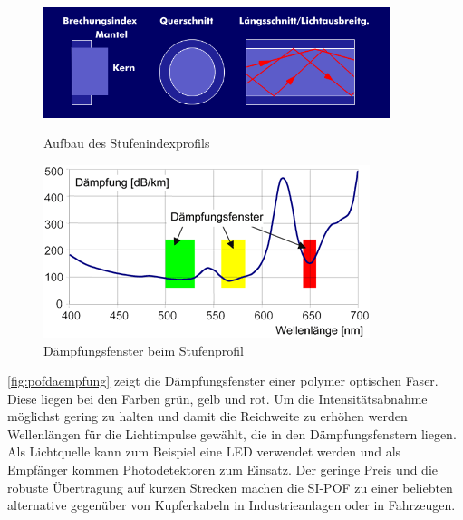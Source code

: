 \begin{figure}[h]
    \begin{center}
        \begin{minipage}[t]{0.4\textwidth}
            \begin{center}
                \includegraphics[width=0.9\textwidth]{Bilder/Optische_Wellenleiter_Die_Polymer_Optische_Faser/Brechzahlprofile/pofsi.png}
                \caption[Aufbau des Stufenindexprofils \newline \url{http://www.itwissen.info/bilder/aufbau-und-brechungsprofil-der-stufenindex-profilfaser.png} (zuletzt aufgerufen am 19.09.2015)]{Aufbau des Stufenindexprofils}
                \label{fig:pofsi}
            \end{center}
        \end{minipage}
        \hspace{0.025\textwidth}
        \begin{minipage}[t]{0.4\textwidth}
            \begin{center}
                \includegraphics[height=0.1\textheight]{Bilder/Optische_Wellenleiter_Die_Polymer_Optische_Faser/Funktionsweise/pofdaempfung.png}
                \caption[Dämpfungsfenster bei einer polymer optischen Faser \newline \url{http://www.pofac.fh-nuernberg.de/pofac/de/was_sind_pof/images/pmma_daempfung.png} (zuletzt aufgerufen am 19.09.2015)]{Dämpfungsfenster beim Stufenprofil}
                \label{fig:pofdaempfung}
            \end{center}
        \end{minipage}
    \end{center}
\end{figure}

\autoref{fig:pofdaempfung} zeigt die Dämpfungsfenster einer polymer optischen
Faser. Diese liegen bei den Farben grün, gelb und rot. Um die Intensitätsabnahme
möglichst gering zu halten und damit die Reichweite zu erhöhen werden
Wellenlängen für die Lichtimpulse gewählt, die in den Dämpfungsfenstern liegen.
Als Lichtquelle kann zum Beispiel eine LED verwendet werden und als Empfänger
kommen Photodetektoren zum Einsatz. Der geringe Preis und die robuste
Übertragung auf kurzen Strecken machen die SI-POF zu einer beliebten alternative
gegenüber von Kupferkabeln in Industrieanlagen oder in Fahrzeugen. \cite{poflee}
